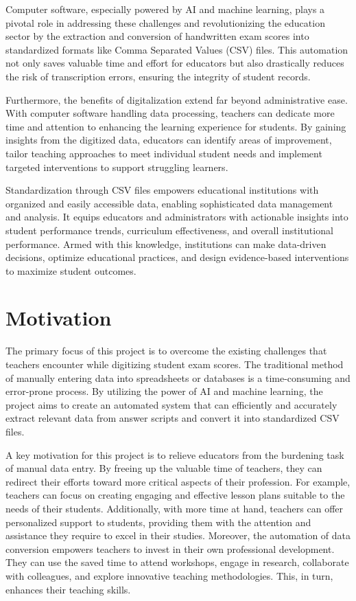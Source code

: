 \noindent Computer software, especially powered by AI and machine learning, plays a pivotal role in addressing these challenges and revolutionizing the education sector by the extraction and conversion of handwritten exam scores into standardized formats like Comma Separated Values (CSV) files. This automation not only saves valuable time and effort for educators but also drastically reduces the risk of transcription errors, ensuring the integrity of student records.

\noindent Furthermore, the benefits of digitalization extend far beyond administrative ease. With computer software handling data processing, teachers can dedicate more time and attention to enhancing the learning experience for students. By gaining insights from the digitized data, educators can identify areas of improvement, tailor teaching approaches to meet individual student needs and implement targeted interventions to support struggling learners.

\noindent Standardization through CSV files empowers educational institutions with organized and easily accessible data, enabling sophisticated data management and analysis. It equips educators and administrators with actionable insights into student performance trends, curriculum effectiveness, and overall institutional performance. Armed with this knowledge, institutions can make data-driven decisions, optimize educational practices, and design evidence-based interventions to maximize student outcomes.

\clearpage

\section{Motivation}

\noindent The primary focus of this project is to overcome the existing challenges that teachers encounter while digitizing student exam scores. The traditional method of manually entering data into spreadsheets or databases is a time-consuming and error-prone process. By utilizing the power of AI and machine learning, the project aims to create an automated system that can efficiently and accurately extract relevant data from answer scripts and convert it into standardized CSV files.


\noindent A key motivation for this project is to relieve educators from the burdening task of manual data entry. By freeing up the valuable time of teachers, they can redirect their efforts toward more critical aspects of their profession. For example, teachers can focus on creating engaging and effective lesson plans suitable to the needs of their students. Additionally, with more time at hand, teachers can offer personalized support to students, providing them with the attention and assistance they require to excel in their studies. Moreover, the automation of data conversion empowers teachers to invest in their own professional development. They can use the saved time to attend workshops, engage in research, collaborate with colleagues, and explore innovative teaching methodologies. This, in turn, enhances their teaching skills.


